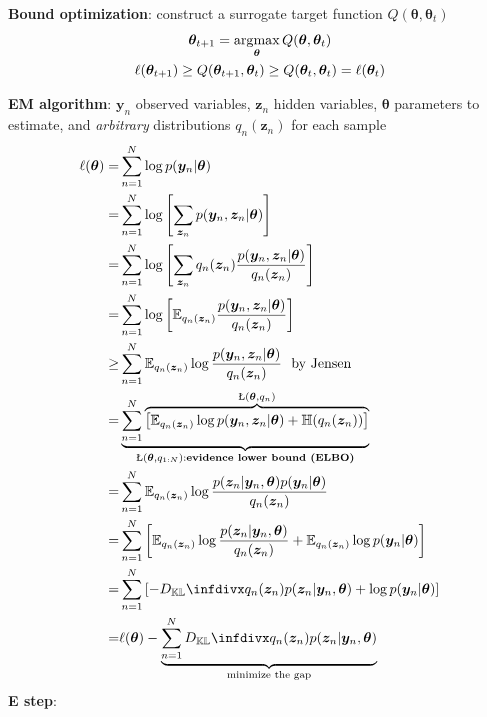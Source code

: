 \textbf{Bound optimization}: construct a surrogate target function $Q(\bm{\theta},\bm{\theta}_{t})$
\begin{gather}
    \bm{\theta}_{t+1}=\operatorname*{\arg\!max}_{\bm{\theta}}{Q(\bm{\theta},\bm{\theta}_{t})}\\
    \ell(\bm{\theta}_{t+1})\geq Q(\bm{\theta}_{t+1},\bm{\theta}_{t})\geq Q(\bm{\theta}_{t},\bm{\theta}_{t})=\ell(\bm{\theta}_{t})
\end{gather}

\textbf{EM algorithm}: $\bm{y}_n$ observed variables, $\bm{z}_n$ hidden variables, $\bm{\theta}$ parameters to estimate, 
and \textit{arbitrary} distributions $q_n(\bm{z}_n)$ for each sample
\begin{align}
    \ell(\bm{\theta})
    =& \sum_{n=1}^N\log{p(\bm{y}_n|\bm{\theta})} \\
    =& \sum_{n=1}^N\log\left[\sum_{\bm{z}_n}p(\bm{y}_n,\bm{z}_n|\bm{\theta})\right] \\
    =& \sum_{n=1}^N\log\left[\sum_{\bm{z}_n}q_n(\bm{z}_n)\frac{p(\bm{y}_n,\bm{z}_n|\bm{\theta})}{q_n(\bm{z}_n)}\right] \\
    =& \sum_{n=1}^N\log\left[\mathbb{E}_{q_n(\bm{z}_n)}\frac{p(\bm{y}_n,\bm{z}_n|\bm{\theta})}{q_n(\bm{z}_n)}\right] \\
    \geq& \sum_{n=1}^N\mathbb{E}_{q_n(\bm{z}_n)}\log\frac{p(\bm{y}_n,\bm{z}_n|\bm{\theta})}{q_n(\bm{z}_n)}~~\text{by Jensen} \\
    =& \underbrace{\sum_{n=1}^N\overbrace{
        \left[\mathbb{E}_{q_n(\bm{z}_n)}\log p(\bm{y}_n,\bm{z}_n|\bm{\theta})+\mathbb{H}(q_n(\bm{z}_n))\right]
    }^{\text{\L}(\bm{\theta},q_n)}}_{\text{\L}(\bm{\theta},q_{1:N})\text{:\textbf{evidence lower bound (ELBO)}}} \\
    =& \sum_{n=1}^N\mathbb{E}_{q_n(\bm{z}_n)}\log\frac{p(\bm{z}_n|\bm{y}_n,\bm{\theta})p(\bm{y}_n|\bm{\theta})}{q_n(\bm{z}_n)} \\
    =& \sum_{n=1}^N\left[
        \mathbb{E}_{q_n(\bm{z}_n)}\log\frac{p(\bm{z}_n|\bm{y}_n,\bm{\theta})}{q_n(\bm{z}_n)} 
        + \mathbb{E}_{q_n(\bm{z}_n)}\log p(\bm{y}_n|\bm{\theta})
    \right] \\
    =& \sum_{n=1}^N\left[
        -\infdiv{q_n(\bm{z}_n)}{p(\bm{z}_n|\bm{y}_n,\bm{\theta})} + \log p(\bm{y}_n|\bm{\theta})
    \right] \\
    =& \ell(\bm{\theta}) - \underbrace{\sum_{n=1}^N\infdiv{q_n(\bm{z}_n)}{p(\bm{z}_n|\bm{y}_n,\bm{\theta})}}_{\text{minimize the gap}}
\end{align}
\textbf{E step}: 
